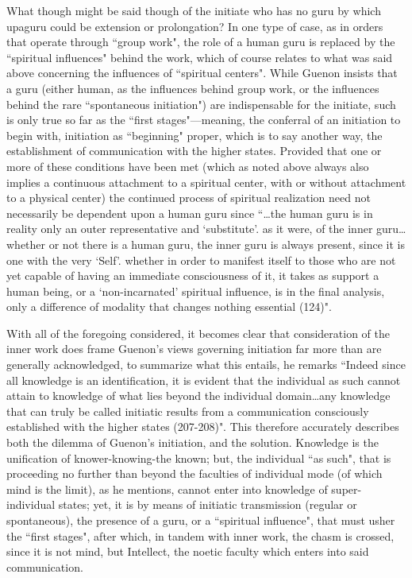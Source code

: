 What though might be said though of the initiate who has no guru by which upaguru could be extension or prolongation? In one type of case, as in orders that operate through ``group work", the role of a human guru is replaced by the ``spiritual influences" behind the work, which of course relates to what was said above concerning the influences of ``spiritual centers". While Guenon insists that a guru (either human, as the influences behind group work, or the influences behind the rare ``spontaneous initiation") are indispensable for the initiate, such is only true so far as the ``first stages"—meaning, the conferral of an initiation to begin with, initiation as ``beginning" proper, which is to say another way, the establishment of communication with the higher states. Provided that one or more of these conditions have been met (which as noted above always also implies a continuous attachment to a spiritual center, with or without attachment to a physical center) the continued process of spiritual realization need not necessarily be dependent upon a human guru since ``…the human guru is in reality only an outer representative and `substitute'. as it were, of the inner guru…whether or not there is a human guru, the inner guru is always present, since it is one with the very `Self'. whether in order to manifest itself to those who are not yet capable of having an immediate consciousness of it, it takes as support a human being, or a `non-incarnated' spiritual influence, is in the final analysis, only a difference of modality that changes nothing essential (124)".

With all of the foregoing considered, it becomes clear that consideration of the inner work does frame Guenon's views governing initiation far more than are generally acknowledged, to summarize what this entails, he remarks ``Indeed since all knowledge is an identification, it is evident that the individual as such cannot attain to knowledge of what lies beyond the individual domain…any knowledge that can truly be called initiatic results from a communication consciously established with the higher states (207-208)". This therefore accurately describes both the dilemma of Guenon's initiation, and the solution. Knowledge is the unification of knower-knowing-the known; but, the individual ``as such", that is proceeding no further than beyond the faculties of individual mode (of which mind is the limit), as he mentions, cannot enter into knowledge of super-individual states; yet, it is by means of initiatic transmission (regular or spontaneous), the presence of a guru, or a ``spiritual influence", that must usher the ``first stages", after which, in tandem with inner work, the chasm is crossed, since it is not mind, but Intellect, the noetic faculty which enters into said communication.

